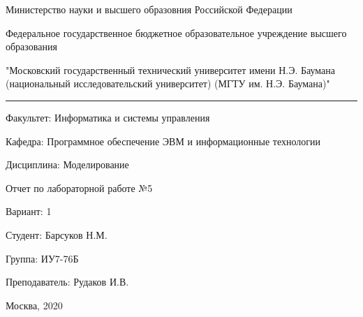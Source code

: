 \begin{center}
	Министерство науки и высшего образовния Российской Федерации
		
	Федеральное государственное бюджетное образовательное учреждение 
	высшего образования
	
	"Московский государственный технический университет имени Н.Э. Баумана (национальный исследовательский университет) (МГТУ им. Н.Э. Баумана)"
\end{center}

\hrule

\begin{flushleft}
	Факультет: Информатика и системы управления
	
	Кафедра: Программное обеспечение ЭВМ и информационные технологии
	
	Дисциплина: Моделирование
\end{flushleft}

\vspace{2cm}

\begin{center}
	Отчет по лабораторной работе №5
	
	Вариант: 1
\end{center}

\vspace{2cm}

\begin{flushleft}
	Студент: Барсуков Н.М.

	Группа: ИУ7-76Б
	
	Преподаватель: Рудаков И.В.
\end{flushleft}

\vspace*{\fill}
\begin{center}
	Москва, 2020
\end{center}